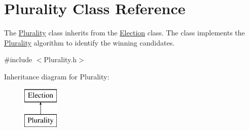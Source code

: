 \hypertarget{class_plurality}{}\section{Plurality Class Reference}
\label{class_plurality}


The \hyperlink{class_plurality}{Plurality} class inherits from the \hyperlink{class_election}{Election} class. The class implements the \hyperlink{class_plurality}{Plurality} algorithm to identify the winning candidates.  




{\ttfamily \#include $<$Plurality.\+h$>$}

Inheritance diagram for Plurality\+:\begin{figure}[H]
\begin{center}
\leavevmode
\includegraphics[height=2.000000cm]{class_plurality}
\end{center}
\end{figure}
